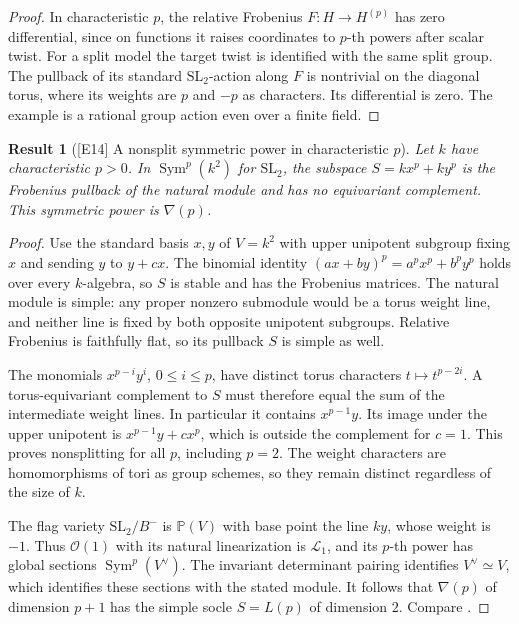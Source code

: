 \documentclass[11pt,a4paper,openany,oneside]{book}
\theoremstyle{resultstyle}
\newtheorem{statement}{Result}[chapter]
\newenvironment{result}[2]{\clubpenalty=10000\begin{statement}[\textnormal{[#1]} #2]\leavevmode\label{res:#1}\ignorespaces}{\end{statement}}
\theoremstyle{definition}
\numberwithin{equation}{chapter}
\begin{document}
\begin{proof}
In characteristic \(p\), the relative Frobenius \(F\colon H\to H^{(p)}\) has zero differential, since on functions it raises coordinates to \(p\)-th powers after scalar twist. For a split model the target twist is identified with the same split group. The pullback of its standard \(\mathrm{SL}_2\)-action along \(F\) is nontrivial on the diagonal torus, where its weights are \(p\) and \(-p\) as characters. Its differential is zero. The example is a rational group action even over a finite field.
\end{proof}

\begin{result}{E14}{A nonsplit symmetric power in characteristic \(p\)}
Let \(k\) have characteristic \(p>0\). In \(\operatorname{Sym}^p(k^2)\) for \(\mathrm{SL}_2\), the subspace \(S=kx^p+ky^p\) is the Frobenius pullback of the natural module and has no equivariant complement. This symmetric power is \(\nabla(p)\).
\end{result}
\begin{proof}
Use the standard basis \(x,y\) of \(V=k^2\) with upper unipotent subgroup fixing \(x\) and sending \(y\) to \(y+c x\). The binomial identity \((a x+b y)^p=a^p x^p+b^p y^p\) holds over every \(k\)-algebra, so \(S\) is stable and has the Frobenius matrices. The natural module is simple: any proper nonzero submodule would be a torus weight line, and neither line is fixed by both opposite unipotent subgroups. Relative Frobenius is faithfully flat, so its pullback \(S\) is simple as well.

The monomials \(x^{p-i}y^i\), \(0\leq i\leq p\), have distinct torus characters \(t\mapsto t^{p-2i}\). A torus-equivariant complement to \(S\) must therefore equal the sum of the intermediate weight lines. In particular it contains \(x^{p-1}y\). Its image under the upper unipotent is \(x^{p-1}y+c x^p\), which is outside the complement for \(c=1\). This proves nonsplitting for all \(p\), including \(p=2\). The weight characters are homomorphisms of tori as group schemes, so they remain distinct regardless of the size of \(k\).

The flag variety \(\mathrm{SL}_2/B^-\) is \(\mathbb P(V)\) with base point the line \(ky\), whose weight is \(-1\). Thus \(\mathcal O(1)\) with its natural linearization is \(\mathcal L_1\), and its \(p\)-th power has global sections \(\operatorname{Sym}^p(V^\vee)\). The invariant determinant pairing identifies \(V^\vee\simeq V\), which identifies these sections with the stated module. It follows that \(\nabla(p)\) of dimension \(p+1\) has the simple socle \(S=L(p)\) of dimension \(2\). Compare \cite[12.56 and 22.46]{milne}.
\end{proof}
\end{document}
